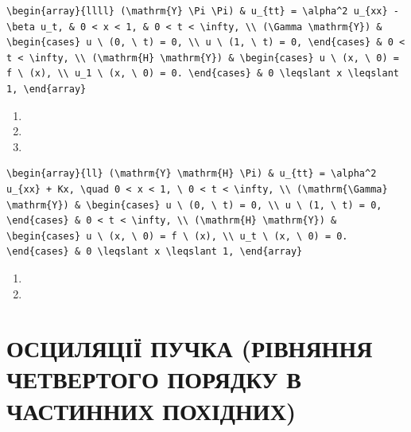 \documentclass[
  ukrainian,
]{article}
\providecommand{\tightlist}{%
  \setlength{\itemsep}{0pt}\setlength{\parskip}{0pt}}
\begin{document}
\begin{verbatim}
\begin{array}{llll} (\mathrm{Y} \Pi \Pi) & u_{tt} = \alpha^2 u_{xx} - \beta u_t, & 0 < x < 1, & 0 < t < \infty, \\ (\Gamma \mathrm{Y}) & \begin{cases} u \ (0, \ t) = 0, \\ u \ (1, \ t) = 0, \end{cases} & 0 < t < \infty, \\ (\mathrm{H} \mathrm{Y}) & \begin{cases} u \ (x, \ 0) = f \ (x), \\ u_1 \ (x, \ 0) = 0. \end{cases} & 0 \leqslant x \leqslant 1, \end{array}
\end{verbatim}

\begin{enumerate}
\def\labelenumi{\arabic{enumi}.}
\setcounter{enumi}{16}
\tightlist
\item
\item
\item
\end{enumerate}

\begin{verbatim}
\begin{array}{ll} (\mathrm{Y} \mathrm{H} \Pi) & u_{tt} = \alpha^2 u_{xx} + Kx, \quad 0 < x < 1, \ 0 < t < \infty, \\ (\mathrm{\Gamma} \mathrm{Y}) & \begin{cases} u \ (0, \ t) = 0, \\ u \ (1, \ t) = 0, \end{cases} & 0 < t < \infty, \\ (\mathrm{H} \mathrm{Y}) & \begin{cases} u \ (x, \ 0) = f \ (x), \\ u_t \ (x, \ 0) = 0. \end{cases} & 0 \leqslant x \leqslant 1, \end{array}
\end{verbatim}

\begin{enumerate}
\def\labelenumi{\arabic{enumi}.}
\setcounter{enumi}{18}
\tightlist
\item
\item
\end{enumerate}

\section{ОСЦИЛЯЦІЇ ПУЧКА (РІВНЯННЯ ЧЕТВЕРТОГО ПОРЯДКУ В ЧАСТИННИХ
ПОХІДНИХ)}\label{ux43eux441ux446ux438ux43bux44fux446ux456ux457-ux43fux443ux447ux43aux430-ux440ux456ux432ux43dux44fux43dux43dux44f-ux447ux435ux442ux432ux435ux440ux442ux43eux433ux43e-ux43fux43eux440ux44fux434ux43aux443-ux432-ux447ux430ux441ux442ux438ux43dux43dux438ux445-ux43fux43eux445ux456ux434ux43dux438ux445}
\end{document}
